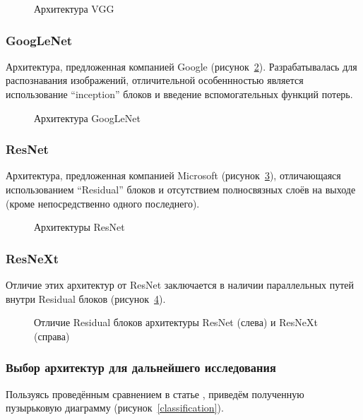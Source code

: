 \begin{figure}[H]
	\caption{Архитектура VGG}
	\label{vgg}
\end{figure}

\subsubsection{GoogLeNet}
Архитектура, предложенная компанией Google \cite{classifications} (рисунок~\ref{googlenet}). Разрабатывалась для распознавания изображений, отличительной особеннностью является использование ``inception'' блоков и введение вспомогательных функций потерь.

\begin{figure}[H]
	\caption{Архитектура GoogLeNet}
	\label{googlenet}
\end{figure}

\subsubsection{ResNet}
Архитектура, предложенная компанией Microsoft \cite{classifications} (рисунок~\ref{resnet}), отличающаяся использованием ``Residual'' блоков и отсутствием полносвязных слоёв на выходе (кроме непосредственно одного последнего).
\begin{figure}[H]
	\caption{Архитектуры ResNet}
	\label{resnet}
\end{figure}

\subsubsection{ResNeXt}
Отличие этих архитектур от ResNet заключается в наличии параллельных путей внутри Residual блоков (рисунок~\ref{resnext}).
\begin{figure}[H]
	\caption{Отличие Residual блоков архитектуры ResNet (слева) и ResNeXt (справа)}
	\label{resnext}
\end{figure}

\subsubsection{Выбор архитектур для дальнейшего исследования}
Пользуясь проведённым сравнением в статье \cite{classification}, приведём полученную пузырьковую диаграмму (рисунок~\ref{classification}). 


